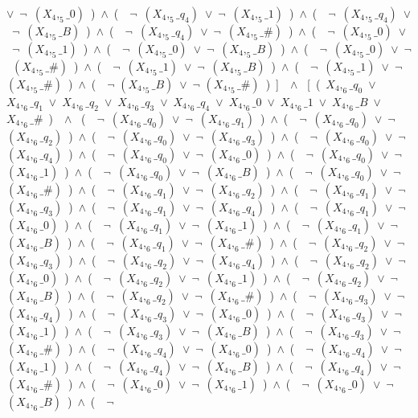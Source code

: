 ﻿\documentclass[a4paper,10pt]{article}
\begin{document}
$\vee$\ $\neg$\ $(X_4,_5\_0)$\ )\ $\wedge$\ (\ \ $\neg$\ $(X_4,_5\_q_4)$\ $\vee$\ $\neg$\ $(X_4,_5\_1)$\ )\ $\wedge$\ (\ \ $\neg$\ $(X_4,_5\_q_4)$\ $\vee$\ $\neg$\ $(X_4,_5\_B)$\ )\ $\wedge$\ (\ \ $\neg$\ $(X_4,_5\_q_4)$\ $\vee$\ $\neg$\ $(X_4,_5\_\#)$\ )\ $\wedge$\ (\ \ $\neg$\ $(X_4,_5\_0)$\ $\vee$\ $\neg$\ $(X_4,_5\_1)$\ )\ $\wedge$\ (\ \ $\neg$\ $(X_4,_5\_0)$\ $\vee$\ $\neg$\ $(X_4,_5\_B)$\ )\ $\wedge$\ (\ \ $\neg$\ $(X_4,_5\_0)$\ $\vee$\ $\neg$\ $(X_4,_5\_\#)$\ )\ $\wedge$\ (\ \ $\neg$\ $(X_4,_5\_1)$\ $\vee$\ $\neg$\ $(X_4,_5\_B)$\ )\ $\wedge$\ (\ \ $\neg$\ $(X_4,_5\_1)$\ $\vee$\ $\neg$\ $(X_4,_5\_\#)$\ )\ $\wedge$\ (\ \ $\neg$ $(X_4,_5\_B)$\ $\vee$\ $\neg$ $(X_4,_5\_\#)$\ )\ ]\ \ $\wedge$ \ [\ (\ $X_4,_6\_q_0$\ $\vee$\ $X_4,_6\_q_1$\ $\vee$\ $X_4,_6\_q_2$\ $\vee$\ $X_4,_6\_q_3$\ $\vee$\ $X_4,_6\_q_4$\ $\vee$\ $X_4,_6\_0$\ $\vee$\ $X_4,_6\_1$\ $\vee$\ $X_4,_6\_B$\ $\vee$\ $X_4,_6\_\#$\ )\ \ $\wedge$ \ (\ \ $\neg$\ $(X_4,_6\_q_0)$\ $\vee$\ $\neg$\ $(X_4,_6\_q_1)$\ )\ $\wedge$\ (\ \ $\neg$\ $(X_4,_6\_q_0)$\ $\vee$\ $\neg$\ $(X_4,_6\_q_2)$\ )\ $\wedge$\ (\ \ $\neg$\ $(X_4,_6\_q_0)$\ $\vee$\ $\neg$\ $(X_4,_6\_q_3)$\ )\ $\wedge$\ (\ \ $\neg$\ $(X_4,_6\_q_0)$\ $\vee$\ $\neg$\ $(X_4,_6\_q_4)$\ )\ $\wedge$\ (\ \ $\neg$\ $(X_4,_6\_q_0)$\ $\vee$\ $\neg$\ $(X_4,_6\_0)$\ )\ $\wedge$\ (\ \ $\neg$\ $(X_4,_6\_q_0)$\ $\vee$\ $\neg$\ $(X_4,_6\_1)$\ )\ $\wedge$\ (\ \ $\neg$\ $(X_4,_6\_q_0)$\ $\vee$\ $\neg$\ $(X_4,_6\_B)$\ )\ $\wedge$\ (\ \ $\neg$\ $(X_4,_6\_q_0)$\ $\vee$\ $\neg$\ $(X_4,_6\_\#)$\ )\ $\wedge$\ (\ \ $\neg$\ $(X_4,_6\_q_1)$\ $\vee$\ $\neg$\ $(X_4,_6\_q_2)$\ )\ $\wedge$\ (\ \ $\neg$\ $(X_4,_6\_q_1)$\ $\vee$\ $\neg$\ $(X_4,_6\_q_3)$\ )\ $\wedge$\ (\ \ $\neg$\ $(X_4,_6\_q_1)$\ $\vee$\ $\neg$\ $(X_4,_6\_q_4)$\ )\ $\wedge$\ (\ \ $\neg$\ $(X_4,_6\_q_1)$\ $\vee$\ $\neg$\ $(X_4,_6\_0)$\ )\ $\wedge$\ (\ \ $\neg$\ $(X_4,_6\_q_1)$\ $\vee$\ $\neg$\ $(X_4,_6\_1)$\ )\ $\wedge$\ (\ \ $\neg$\ $(X_4,_6\_q_1)$\ $\vee$\ $\neg$\ $(X_4,_6\_B)$\ )\ $\wedge$\ (\ \ $\neg$\ $(X_4,_6\_q_1)$\ $\vee$\ $\neg$\ $(X_4,_6\_\#)$\ )\ $\wedge$\ (\ \ $\neg$\ $(X_4,_6\_q_2)$\ $\vee$\ $\neg$\ $(X_4,_6\_q_3)$\ )\ $\wedge$\ (\ \ $\neg$\ $(X_4,_6\_q_2)$\ $\vee$\ $\neg$\ $(X_4,_6\_q_4)$\ )\ $\wedge$\ (\ \ $\neg$\ $(X_4,_6\_q_2)$\ $\vee$\ $\neg$\ $(X_4,_6\_0)$\ )\ $\wedge$\ (\ \ $\neg$\ $(X_4,_6\_q_2)$\ $\vee$\ $\neg$\ $(X_4,_6\_1)$\ )\ $\wedge$\ (\ \ $\neg$\ $(X_4,_6\_q_2)$\ $\vee$\ $\neg$\ $(X_4,_6\_B)$\ )\ $\wedge$\ (\ \ $\neg$\ $(X_4,_6\_q_2)$\ $\vee$\ $\neg$\ $(X_4,_6\_\#)$\ )\ $\wedge$\ (\ \ $\neg$\ $(X_4,_6\_q_3)$\ $\vee$\ $\neg$\ $(X_4,_6\_q_4)$\ )\ $\wedge$\ (\ \ $\neg$\ $(X_4,_6\_q_3)$\ $\vee$\ $\neg$\ $(X_4,_6\_0)$\ )\ $\wedge$\ (\ \ $\neg$\ $(X_4,_6\_q_3)$\ $\vee$\ $\neg$\ $(X_4,_6\_1)$\ )\ $\wedge$\ (\ \ $\neg$\ $(X_4,_6\_q_3)$\ $\vee$\ $\neg$\ $(X_4,_6\_B)$\ )\ $\wedge$\ (\ \ $\neg$\ $(X_4,_6\_q_3)$\ $\vee$\ $\neg$\ $(X_4,_6\_\#)$\ )\ $\wedge$\ (\ \ $\neg$\ $(X_4,_6\_q_4)$\ $\vee$\ $\neg$\ $(X_4,_6\_0)$\ )\ $\wedge$\ (\ \ $\neg$\ $(X_4,_6\_q_4)$\ $\vee$\ $\neg$\ $(X_4,_6\_1)$\ )\ $\wedge$\ (\ \ $\neg$\ $(X_4,_6\_q_4)$\ $\vee$\ $\neg$\ $(X_4,_6\_B)$\ )\ $\wedge$\ (\ \ $\neg$\ $(X_4,_6\_q_4)$\ $\vee$\ $\neg$\ $(X_4,_6\_\#)$\ )\ $\wedge$\ (\ \ $\neg$\ $(X_4,_6\_0)$\ $\vee$\ $\neg$\ $(X_4,_6\_1)$\ )\ $\wedge$\ (\ \ $\neg$\ $(X_4,_6\_0)$\ $\vee$\ $\neg$\ $(X_4,_6\_B)$\ )\ $\wedge$\ (\ \ $\neg$\ 
\end{document}
